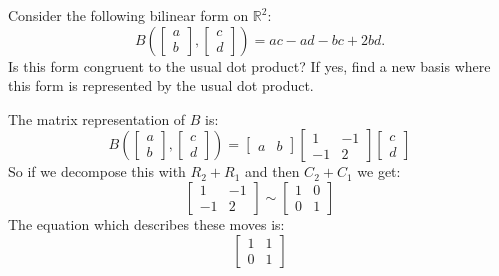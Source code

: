 \documentclass[11pt]{article}
\begin{document}
\begin{problem}
  \begin{parts}

  \item Consider the following bilinear form on $\mathbb{R}^2$:
    \[
      B\!\left(
        \begin{bmatrix}a\\b
        \end{bmatrix},
        \begin{bmatrix}c\\d
      \end{bmatrix}\right)
      = ac - ad - bc + 2bd.
    \]
    Is this form congruent to the usual dot product? If yes, find a new basis
    where this form is represented by the usual dot product.

    \begin{solution}
      The matrix representation of \( B \) is:
      \[
        B\left(
          \begin{bmatrix}
            a \\ b
          \end{bmatrix},
          \begin{bmatrix}
            c \\ d
        \end{bmatrix}\right) =
        \begin{bmatrix}
          a & b
        \end{bmatrix}
        \begin{bmatrix}
          1 & -1 \\
          -1 & 2
        \end{bmatrix}
        \begin{bmatrix}
          c \\ d
        \end{bmatrix}
      \]
      So if we decompose this with \( R_2 + R_1 \) and then \( C_2 +
      C_1 \) we get:
      \[
        \begin{bmatrix}
          1 & -1 \\
          -1 & 2
        \end{bmatrix}\sim
        \begin{bmatrix}
          1 & 0 \\
          0 & 1
        \end{bmatrix}
      \]
      The equation which describes these moves is:
      \[
        \begin{bmatrix}
          1 & 1 \\
          0 & 1

\end{bmatrix}\]
\end{solution}
\end{parts}
\end{problem}
\end{document}
